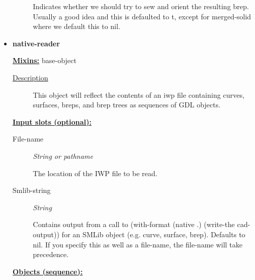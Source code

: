 \documentclass [11pt]{book}
\begin{document}
\begin{itemize}
\begin{description}
 Indicates whether we should try to sew and orient the resulting brep. Usually a good idea
and this is defaulted to t, except for merged-solid where we default this to nil.




\end{description}







\item {}
\label{prim:native-reader}
\textbf{native-reader}


\textbf{
\underline{Mixins:}} base-object





\begin{description}

\item [
\underline{Description}]


This object will reflect the contents of an iwp file containing
curves, surfaces, breps, and brep trees as sequences of GDL objects. 




\end{description}








\textbf{
\underline{Input slots (optional):}}

\begin{description}

\item [File-name]
\emph{String or pathname}

 The location of the IWP file to be read.




\item [Smlib-string]
\emph{String}

 Contains output from a call to (with-format (native .) (write-the cad-output))
for an SMLib object (e.g. curve, surface, brep). Defaults to nil. If you specify this as well as a
file-name, the file-name will take precedence.




\end{description}






\textbf{
\underline{Objects (sequence):}}


\end{itemize}
\end{document}
